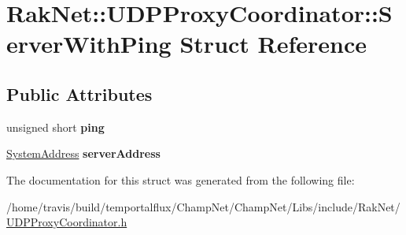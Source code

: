 \hypertarget{struct_rak_net_1_1_u_d_p_proxy_coordinator_1_1_server_with_ping}{\section{Rak\-Net\-:\-:U\-D\-P\-Proxy\-Coordinator\-:\-:Server\-With\-Ping Struct Reference}
\label{struct_rak_net_1_1_u_d_p_proxy_coordinator_1_1_server_with_ping}
}
\subsection*{Public Attributes}
\begin{DoxyCompactItemize}
\item 
\hypertarget{struct_rak_net_1_1_u_d_p_proxy_coordinator_1_1_server_with_ping_a8995bb6ed6740a945be9ecd6e0a405cb}{unsigned short {\bfseries ping}}\label{struct_rak_net_1_1_u_d_p_proxy_coordinator_1_1_server_with_ping_a8995bb6ed6740a945be9ecd6e0a405cb}

\item 
\hypertarget{struct_rak_net_1_1_u_d_p_proxy_coordinator_1_1_server_with_ping_a027387c5b45c7007684c46b245bdde35}{\hyperlink{struct_rak_net_1_1_system_address}{System\-Address} {\bfseries server\-Address}}\label{struct_rak_net_1_1_u_d_p_proxy_coordinator_1_1_server_with_ping_a027387c5b45c7007684c46b245bdde35}

\end{DoxyCompactItemize}


The documentation for this struct was generated from the following file\-:\begin{DoxyCompactItemize}
\item 
/home/travis/build/temportalflux/\-Champ\-Net/\-Champ\-Net/\-Libs/include/\-Rak\-Net/\hyperlink{_u_d_p_proxy_coordinator_8h}{U\-D\-P\-Proxy\-Coordinator.\-h}\end{DoxyCompactItemize}

